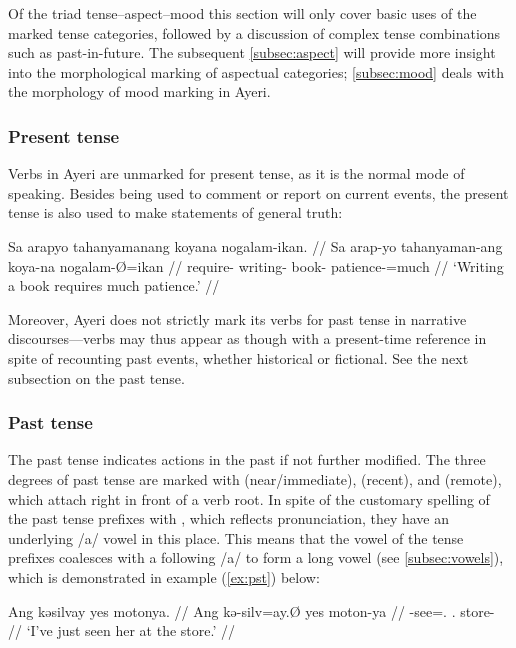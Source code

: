 Of the triad tense--aspect--mood this section will only cover basic uses of 
the marked tense categories, followed by a discussion of complex tense 
combinations such as past-in-future. The subsequent \autoref{subsec:aspect} 
will provide more insight into the morphological marking of aspectual 
categories; \autoref{subsec:mood} deals with the morphology of mood marking in 
Ayeri.

\subsubsection{Present tense}
Verbs in Ayeri are unmarked for present tense, as it is the normal mode of 
speaking. Besides being used to comment or report on current events, the 
present tense is also used to make statements of general truth:

\ex\begingl
	\gla Sa arapyo tahanyamanang koyana nogalam-ikan. //
	\glb Sa arap-yo tahanyaman-ang koya-na nogalam-Ø=ikan //
	\glc \PatT{} require-\TsgN{} writing-\Aarg{} book-\Gen{} 
		patience-\Top{}=much //
	\glft `Writing a book requires much patience.' //
\endgl\xe

Moreover, Ayeri does not strictly mark its verbs for past tense in narrative 
discourses---verbs may thus appear as though with a present-time reference in 
spite of recounting past events, whether historical or fictional. See the next 
subsection on the past tense.


\subsubsection{Past tense}
\label{subsubsec:past}
The past tense indicates actions in the past if not further modified. The three
degrees of past tense are marked with  (near/immediate),
 (recent), and  (remote), which attach right in
front of a verb root. In spite of the customary spelling of the past tense
prefixes with , which reflects pronunciation, they have an underlying
/a/ vowel in this place. This means that the vowel of the tense prefixes
coalesces with a following /a/ to form a long vowel (see
\autoref{subsec:vowels}), which is demonstrated in example (\ref{ex:pst})
below:

\pex
\a\label{ex:npst}\begingl
	\gla Ang kəsilvay yes motonya. //
	\glb Ang kə-silv=ay.Ø yes moton-ya //
	\glc \AgtT{} \NPst{}-see=\Fsg{}.\Top{} \TsgF{}.\Parg{} store-\Loc{} //
	\glft `I've just seen her at the store.' //
\endgl

